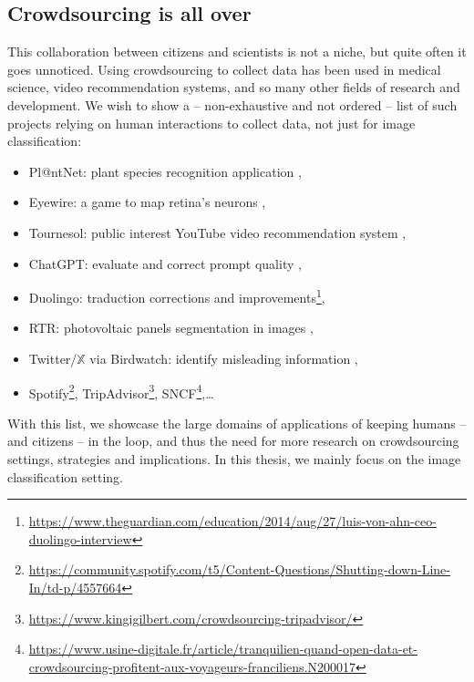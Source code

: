 \subsection{Crowdsourcing is all over}

This collaboration between citizens and scientists is not a niche, but quite often it goes unnoticed.
Using crowdsourcing to collect data has been used in medical science, video recommendation systems, and so many other fields of research and development.
We wish to show a -- non-exhaustive and not ordered -- list of such projects relying on human interactions to collect data, not just for image classification:
\begin{itemize}
    \item Pl@ntNet: plant species recognition application \citep{plantet},
    \item Eyewire: a game to map retina's neurons \citep{tinati2017investigation},
    \item Tournesol: public interest YouTube video recommendation system \citep{hoang2021tournesol},
    \item ChatGPT: evaluate and correct prompt quality \citep{openai2023gpt4},
    \item Duolingo: traduction corrections and improvements\footnote{\url{https://www.theguardian.com/education/2014/aug/27/luis-von-ahn-ceo-duolingo-interview}},
    \item RTR: photovoltaic panels segmentation in images \citep{kasmi2023crowdsourced},
    \item Twitter/$\mathbb{X}$ via Birdwatch: identify misleading information \citep{wojcik2022birdwatch},
    \item Spotify\footnote{\url{https://community.spotify.com/t5/Content-Questions/Shutting-down-Line-In/td-p/4557664}}, TripAdvisor\footnote{\url{https://www.kingigilbert.com/crowdsourcing-tripadvisor/}}, SNCF\footnote{\url{https://www.usine-digitale.fr/article/tranquilien-quand-open-data-et-crowdsourcing-profitent-aux-voyageurs-franciliens.N200017}},\dots
\end{itemize}

With this list, we showcase the large domains of applications of keeping humans -- and citizens -- in the loop, and thus the need for more research on crowdsourcing settings, strategies and implications.
In this thesis, we mainly focus on the image classification setting.

